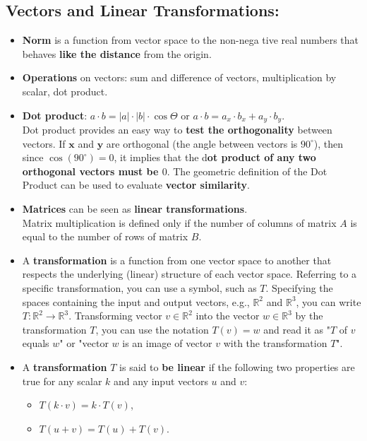 \documentclass[16pt]{article}
\begin{document}
	\subsection{Vectors and Linear Transformations:}
	\begin{itemize}
	\item {\textbf{Norm} is a function from vector space to the non-nega tive real numbers that behaves \textbf{like the distance} from the origin.}
	\item \textbf{Operations} on vectors: sum and difference of vectors, multiplication by scalar, dot product.
	\item \textbf{Dot product}: $a \cdot b = |a| \cdot |b| \cdot \cos \Theta$ or $a \cdot b = a_x \cdot b_x + a_y \cdot b_y$.
	\\
	Dot product provides an easy way to \textbf{test the orthogonality} between vectors. If $\mathbf{x}$ and $\mathbf{y}$ are orthogonal (the angle between vectors is $90^\circ$), then since $\cos(90^\circ)=0$, it implies that the d\textbf{ot product of any two orthogonal vectors must be $0$}. The geometric definition of the Dot Product can be used to evaluate \textbf{vector similarity}.
	\item \textbf{Matrices} can be seen as \textbf{linear transformations}.
	\\
	Matrix multiplication is defined only if the number of columns of matrix $A$ is equal to the number of rows of matrix $B$.
	\item A \textbf{transformation} is a function from one vector space to another that respects the underlying (linear) structure of each vector space. Referring to a specific transformation, you can use a symbol, such as $T$. Specifying the spaces containing the input and output vectors, e.g., $\mathbb{R}^2$ and $\mathbb{R}^3$, you can write $T: \mathbb{R}^2 \to \mathbb{R}^3$. Transforming vector $v \in \mathbb{R}^2$ into the vector $w \in \mathbb{R}^3$ by the transformation $T$, you can use the notation $T(v) = w$ and read it as "$ T $ of $ v $ equals $ w $" or "vector $ w $ is an image of vector $ v $ with the transformation $ T $".
	\item A \textbf{transformation} $T$ is said to \textbf{be linear} if the following two properties are true for any scalar $k$ and any input vectors $u$ and $v$:
	\begin{itemize}
		\item $T(k \cdot v) = k \cdot T(v)$,
		\item $T(u+v) = T(u) + T(v)$.
	\end{itemize}

\end{itemize}
\end{document}
